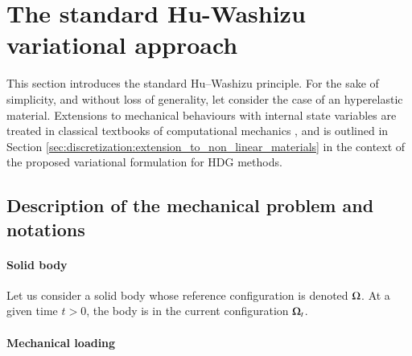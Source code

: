 \section{The standard Hu-Washizu variational approach}
\label{sec_model_problem}

This section introduces the standard Hu–Washizu
principle. For the sake of simplicity, and without loss of generality,
let consider the case of an hyperelastic material. Extensions to
mechanical behaviours with internal state variables are treated in
classical textbooks of computational mechanics
\cite{belytschko_nonlinear_nodate,besson_non-linear_2010}, and is outlined in Section \ref{sec:discretization:extension_to_non_linear_materials}
in the context of the proposed variational formulation for HDG methods.

\subsection{Description of the mechanical problem and notations}

\paragraph{Solid body}

Let us consider a solid body whose reference configuration is denoted
$\Omega$. At a given time $t > 0$, the body is in the current
configuration $\Omega_t$.

\paragraph{Mechanical loading}

